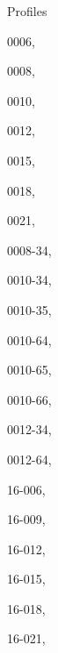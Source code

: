 \documentclass[11pt]{book}
\begin{document}
 \newpage
 \newpage
  
 \twocolumn

\begin{theindex}
 Profiles
 \item 0006, \hyperref[p0006]{\pageref{p0006}}
 \item 0008, \hyperref[p0008]{\pageref{p0008}}
 \item 0010, \hyperref[p0010]{\pageref{p0010}}
 \item 0012, \hyperref[p0012]{\pageref{p0012}}
 \item 0015, \hyperref[p0015]{\pageref{p0015}}
 \item 0018, \hyperref[p0018]{\pageref{p0018}}
 \item 0021, \hyperref[p0021]{\pageref{p0021}}
 \item 0008-34, \hyperref[p0008-34]{\pageref{p0008-34}}
 \item 0010-34, \hyperref[p0010-34]{\pageref{p0010-34}}
 \item 0010-35, \hyperref[p0010-35]{\pageref{p0010-35}}
 \item 0010-64, \hyperref[p0010-64]{\pageref{p0010-64}}
 \item 0010-65, \hyperref[p0010-65]{\pageref{p0010-65}}
 \item 0010-66, \hyperref[p0010-66]{\pageref{p0010-66}}
 \item 0012-34, \hyperref[p0012-34]{\pageref{p0012-34}}
 \item 0012-64, \hyperref[p0012-64]{\pageref{p0012-64}}
 \item 16-006, \hyperref[p16-006]{\pageref{p16-006}}
 \item 16-009, \hyperref[p16-009]{\pageref{p16-009}}
 \item 16-012, \hyperref[p16-012]{\pageref{p16-012}}
 \item 16-015, \hyperref[p16-015]{\pageref{p16-015}}
 \item 16-018, \hyperref[p16-018]{\pageref{p16-018}}
 \item 16-021, \hyperref[p16-021]{\pageref{p16-021}}
  

\end{theindex}
\end{document}
